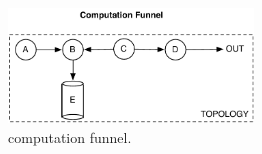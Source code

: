 \begin{figure}
	\begin{center}
		\includegraphics[width=6.5cm,draft]{images/fig5}
		\caption{computation funnel.}
		\label{fig:funnel}
	\end{center}
\end{figure}

%
%
%
%
%
%
